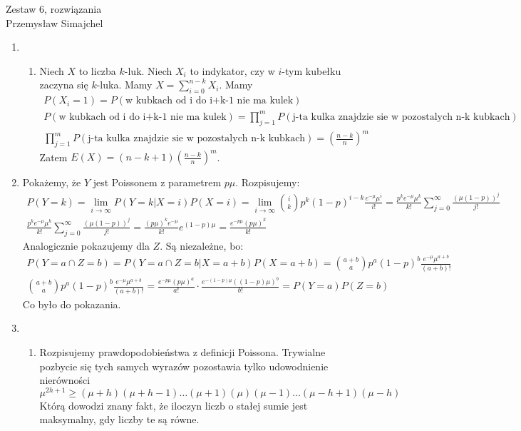 \documentclass{article}
\begin{document}
{\begin{center}\LARGE Zestaw 6, rozwiązania \\\large Przemysław Simajchel \smallskip\end{center}}
	\begin{enumerate}
		\item 
		\begin{enumerate}
			\item Niech $X$ to liczba $k$-luk. Niech $X_i$ to indykator, czy w $i$-tym kubełku zaczyna się $k$-luka. Mamy $X = \sum_{i=0}^{n-k} X_i$.
			Mamy 
			\begin{gather*}
			P(X_i=1) = P(\text{w kubkach od i do i+k-1 nie ma kulek}) \\
			P(\text{w kubkach od i do i+k-1 nie ma kulek}) = \prod_{j=1}^m P(\text{j-ta kulka znajdzie sie w pozostalych n-k kubkach}) \\ 
			\prod_{j=1}^m P(\text{j-ta kulka znajdzie sie w pozostalych n-k kubkach}) = \left(\frac{n-k}{n}\right)^m
			\end{gather*}
			Zatem $E(X) = (n-k+1) \left(\frac{n-k}{n}\right)^m$.
			
		\end{enumerate}
		
		\item 
		Pokażemy, że $Y$ jest Poissonem z parametrem $p\mu$. Rozpisujemy:
		\begin{gather*}
			P(Y=k) = \lim_{i \to \infty} P(Y = k | X = i) P(X = i) = \lim_{i \to \infty} {i \choose k}p^k(1-p)^{i-k}\frac{e^{-\mu}\mu^i}{i!} = \frac{p^k e^{-\mu} \mu^k}{k!} \sum_{j=0}^{\infty} \frac{(\mu(1-p))^j}{j!} \\
			\frac{p^k e^{-\mu} \mu^k}{k!} \sum_{j=0}^{\infty} \frac{(\mu(1-p))^j}{j!} = \frac{(p\mu)^k e^{-\mu}}{k!} e^{(1-p)\mu} = \frac{e^{-p\mu}(p\mu)^k}{k!}
		\end{gather*}
		Analogicznie pokazujemy dla $Z$. Są niezależne, bo:
		\begin{gather*}
			P(Y = a \cap Z = b) = P(Y = a \cap Z = b | X = a+b) P(X = a+b) = {{a+b}\choose a}p^a(1-p)^b\frac{e^{-\mu}\mu^{a+b}}{(a+b)!} \\
			{{a+b}\choose a}p^a(1-p)^b\frac{e^{-\mu}\mu^{a+b}}{(a+b)!} =  \frac{e^{-p\mu}(p\mu)^a}{a!} \cdot \frac{e^{-(1-p)\mu}((1-p)\mu)^b}{b!} = P(Y=a) P(Z=b)
		\end{gather*}
		Co było do pokazania.
		\item 
		\begin{enumerate}
			\item  Rozpisujemy prawdopodobieństwa z definicji Poissona. Trywialne pozbycie się tych samych wyrazów pozostawia tylko udowodnienie nierówności
			\[
			\mu^{2h+1} \geq (\mu + h)(\mu + h - 1)\ldots (\mu +1)(\mu)(\mu - 1) \ldots (\mu - h + 1)(\mu - h)
			\]
			Którą dowodzi znany fakt, że iloczyn liczb o stałej sumie jest maksymalny, gdy liczby te są równe.
			

\end{enumerate}
\end{enumerate}
\end{document}
